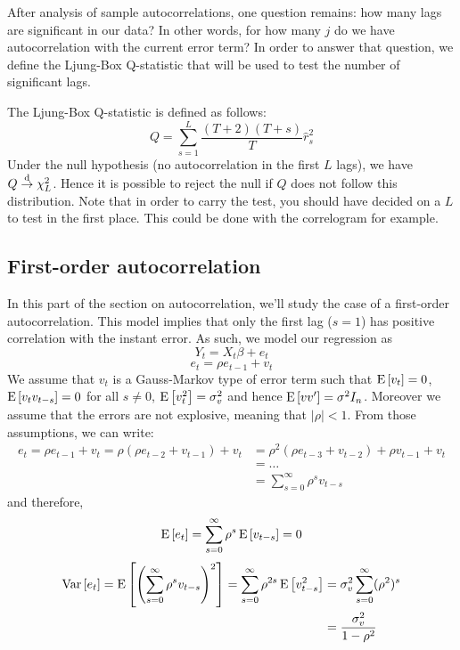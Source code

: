 After analysis of sample autocorrelations, one question remains: how many lags are significant in our data? In other words, for how many $j$ do we have autocorrelation with the current error term? In order to answer that question, we define the Ljung-Box Q-statistic that will be used to test the number of significant lags.

\begin{definition}
The Ljung-Box Q-statistic is defined as follows: $$Q = \sum_{s = 1}^{L} \frac{(T+2)(T+s)}{T} \hat r_s^2 $$ Under the null hypothesis (no autocorrelation in the first $L$ lags), we have $Q\overset{\text{d}}{\to} \chi_L^2$. Hence it is possible to reject the null if $Q$ does not follow this distribution. Note that in order to carry the test, you should have decided on a $L$ to test in the first place. This could be done with the correlogram for example.
\end{definition}

\subsection{First-order autocorrelation}

In this part of the section on autocorrelation, we'll study the case of a first-order autocorrelation. This model implies that only the first lag ($s=1$) has positive correlation with the instant error. As such, we model our regression as $$Y_t = X_t\beta + e_t $$ $$e_t = \rho e_{t-1} + v_t $$ We assume that $v_t$ is a Gauss-Markov type of error term such that $\operatorname{E}\left[v_t\right] = 0$, $\operatorname{E}\left[v_tv_{t-s}\right]=0$ for all $s\neq 0$, $\operatorname{E}\left[v_t^2\right] = \sigma_v^2$ and hence $\operatorname{E}\left[vv'\right] = \sigma^2I_n$. Moreover we assume that the errors are not explosive, meaning that $\vert\rho\vert < 1$. From those assumptions, we can write:\begin{align*}
e_t = \rho e_{t-1} + v_t = \rho ( \rho e_{t-2} + v_{t-1}) + v_t & = \rho^2( \rho e_{t-3} + v_{t-2}) + \rho v_{t-1} + v_t \\ & = \dots \\ & = \sum_{s=0}^{\infty} \rho^s v_{t-s}
\end{align*} and therefore, $$ \operatorname{E}\left[e_t\right] = \sum_{s=0}^{\infty} \rho^s \operatorname{E}\left[v_{t-s}\right] = 0 $$ 
\begin{align*}
\operatorname{Var}\left[e_t\right] = \operatorname{E}\left[\left(\sum_{s=0}^{\infty} \rho^s v_{t-s}\right)^2\right] = \sum_{s=0}^{\infty} \rho^{2s} \operatorname{E}\left[v_{t-s}^2\right]  & = \sigma_{v}^2 \sum_{s=0}^{\infty} (\rho^{2})^s \\ & =  \frac{\sigma_{v}^2}{1 - \rho^2}
\end{align*}

